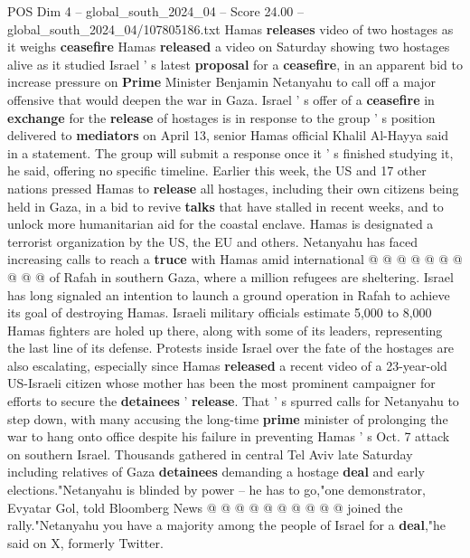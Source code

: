 \begin{textsample}{POS Dim 4 – global\_south\_2024\_04 – Score 24.00 – global\_south\_2024\_04/107805186.txt}  \label{ex:f4_pos_262}
Hamas \textbf{releases} video of two hostages as it weighs \textbf{ceasefire} Hamas \textbf{released} a video on Saturday showing two hostages alive as it studied Israel ' s latest \textbf{proposal} for a \textbf{ceasefire}, in an apparent bid to increase pressure on \textbf{Prime} Minister Benjamin Netanyahu to call off a major offensive that would deepen the war in Gaza.
Israel ' s offer of a \textbf{ceasefire} in \textbf{exchange} for the \textbf{release} of hostages is in response to the group ' s position delivered to \textbf{mediators} on April 13, senior Hamas official Khalil Al-Hayya said in a statement.
The group will submit a response once it ' s finished studying it, he said, offering no specific timeline.
Earlier this week, the US and 17 other nations pressed Hamas to \textbf{release} all hostages, including their own citizens being held in Gaza, in a bid to revive \textbf{talks} that have stalled in recent weeks, and to unlock more humanitarian aid for the coastal enclave.
Hamas is designated a terrorist organization by the US, the EU and others.
Netanyahu has faced increasing calls to reach a \textbf{truce} with Hamas amid international @ @ @ @ @ @ @ @ @ @ of Rafah in southern Gaza, where a million refugees are sheltering.
Israel has long signaled an intention to launch a ground operation in Rafah to achieve its goal of destroying Hamas.
Israeli military officials estimate 5,000 to 8,000 Hamas fighters are holed up there, along with some of its leaders, representing the last line of its defense.
Protests inside Israel over the fate of the hostages are also escalating, especially since Hamas \textbf{released} a recent video of a 23-year-old US-Israeli citizen whose mother has been the most prominent campaigner for efforts to secure the \textbf{detainees} ' \textbf{release}.
That ' s spurred calls for Netanyahu to step down, with many accusing the long-time \textbf{prime} minister of prolonging the war to hang onto office despite his failure in preventing Hamas ' s Oct. 7 attack on southern Israel.
Thousands gathered in central Tel Aviv late Saturday including relatives of Gaza \textbf{detainees} demanding a hostage \textbf{deal} and early elections."Netanyahu is blinded by power -- he has to go,"one demonstrator, Evyatar Gol, told Bloomberg News @ @ @ @ @ @ @ @ @ @ joined the rally."Netanyahu you have a majority among the people of Israel for a \textbf{deal},"he said on X, formerly Twitter.

\end{textsample}
